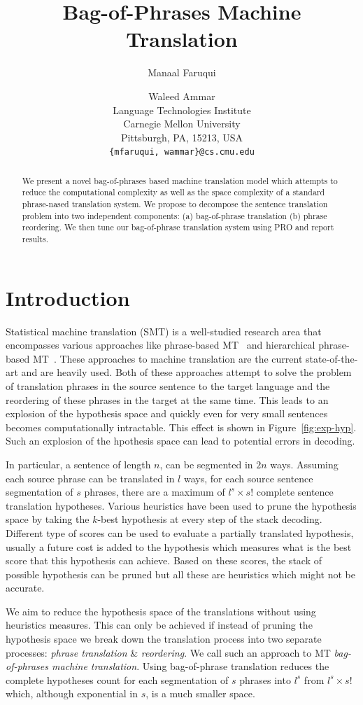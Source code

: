\documentclass[11pt]{article}
\title{Bag-of-Phrases Machine Translation}
\author{Manaal Faruqui \and Waleed Ammar\\
  Language Technologies Institute \\
  Carnegie Mellon University \\
  Pittsburgh, PA, 15213, USA \\
  {\tt \{mfaruqui, wammar\}@cs.cmu.edu} 
}
\date{}
\numberwithin{equation}{section}
\begin{document}
\maketitle
\begin{abstract}
	
We present a novel bag-of-phrases based machine translation model which attempts to reduce the
computational complexity as well as the space complexity of a standard phrase-nased translation
system. We propose to decompose the sentence translation problem into two independent components: (a) 
bag-of-phrase translation (b) phrase reordering. We then tune our bag-of-phrase translation system using PRO and report results.
\end{abstract}

\section{Introduction}
Statistical machine translation (SMT) is a well-studied research area that encompasses various approaches like 
phrase-based MT~\cite{Koehn:2003:SPT:1073445.1073462} and hierarchical phrase-based MT~\cite{Chiang:2007:HPT:1268656.1268659}.
These approaches to machine translation are the current state-of-the-art and are heavily used. Both of these approaches
attempt to solve the problem of translation phrases in the source sentence to the target language and the reordering
of these phrases in the target at the same time. This leads to an explosion of the hypothesis space and quickly
even for very small sentences becomes computationally intractable. This effect is shown in Figure~\ref{fig:exp-hyp}. Such an explosion
of the hpothesis space can lead to potential errors in decoding.

In particular, a sentence of length $n$, can be segmented in $2n$ ways. Assuming each source phrase can be translated in $l$ ways, for each source sentence segmentation of $s$ phrases, there are a maximum of $l^s \times s!$ complete sentence translation hypotheses.
Various heuristics have been used to prune the hypothesis space by taking the $k$-best hypothesis at every step of the stack decoding.
Different type of scores can be used to evaluate a partially translated hypothesis, usually a future cost is added to the hypothesis 
which measures what is the best score that this hypothesis can achieve. Based on these scores, the stack of possible hypothesis can
be pruned but all these are heuristics which might not be accurate.

We aim to reduce the hypothesis space of the translations without using heuristics measures. This can only be achieved if instead
of pruning the hypothesis space we break down the translation process into two separate processes: \textit{phrase translation} \& 
\textit{reordering}. We call such an approach to MT \textit{bag-of-phrases machine translation}. Using bag-of-phrase translation reduces the complete hypotheses count for each segmentation of $s$ phrases into $l^s$ from $l^s \times s!$ which, although exponential in $s$, is a much smaller space.
\end{document}
